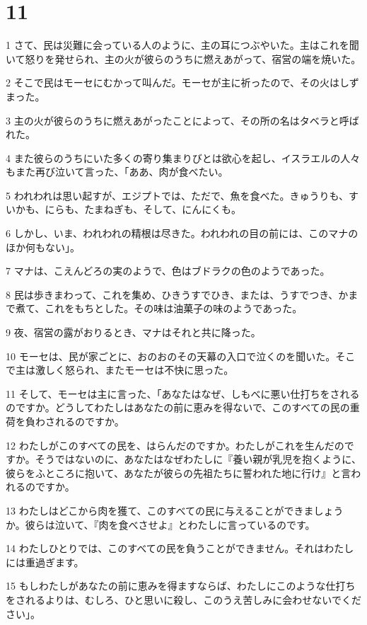 \chapter{11}

\par 1 さて、民は災難に会っている人のように、主の耳につぶやいた。主はこれを聞いて怒りを発せられ、主の火が彼らのうちに燃えあがって、宿営の端を焼いた。
\par 2 そこで民はモーセにむかって叫んだ。モーセが主に祈ったので、その火はしずまった。
\par 3 主の火が彼らのうちに燃えあがったことによって、その所の名はタベラと呼ばれた。
\par 4 また彼らのうちにいた多くの寄り集まりびとは欲心を起し、イスラエルの人々もまた再び泣いて言った、「ああ、肉が食べたい。
\par 5 われわれは思い起すが、エジプトでは、ただで、魚を食べた。きゅうりも、すいかも、にらも、たまねぎも、そして、にんにくも。
\par 6 しかし、いま、われわれの精根は尽きた。われわれの目の前には、このマナのほか何もない」。
\par 7 マナは、こえんどろの実のようで、色はブドラクの色のようであった。
\par 8 民は歩きまわって、これを集め、ひきうすでひき、または、うすでつき、かまで煮て、これをもちとした。その味は油菓子の味のようであった。
\par 9 夜、宿営の露がおりるとき、マナはそれと共に降った。
\par 10 モーセは、民が家ごとに、おのおのその天幕の入口で泣くのを聞いた。そこで主は激しく怒られ、またモーセは不快に思った。
\par 11 そして、モーセは主に言った、「あなたはなぜ、しもべに悪い仕打ちをされるのですか。どうしてわたしはあなたの前に恵みを得ないで、このすべての民の重荷を負わされるのですか。
\par 12 わたしがこのすべての民を、はらんだのですか。わたしがこれを生んだのですか。そうではないのに、あなたはなぜわたしに『養い親が乳児を抱くように、彼らをふところに抱いて、あなたが彼らの先祖たちに誓われた地に行け』と言われるのですか。
\par 13 わたしはどこから肉を獲て、このすべての民に与えることができましょうか。彼らは泣いて、『肉を食べさせよ』とわたしに言っているのです。
\par 14 わたしひとりでは、このすべての民を負うことができません。それはわたしには重過ぎます。
\par 15 もしわたしがあなたの前に恵みを得ますならば、わたしにこのような仕打ちをされるよりは、むしろ、ひと思いに殺し、このうえ苦しみに会わせないでください」。
